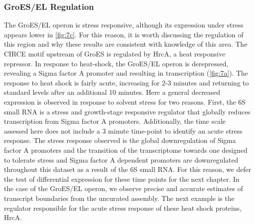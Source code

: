 \subsubsection{GroES/EL Regulation}
The GroES/EL operon is stress responsive, although its expression under stress appears lower in \ref{fig:7c}. For this reason, it is worth discussing the regulation of this region and why these results are consistent with knowledge of this area. The CIRCE motif upstream of GroES is regulated by HrcA, a heat responsive repressor\cite{42,77,78}. In response to heat-shock, the GroES/EL operon is derepressed, revealing a Sigma factor A promoter and resulting in transcription (\ref{fig:7a}). The response to heat shock is fairly acute, increasing for 2-3 minutes and returning to standard levels after an additional 10 minutes\cite{77}. Here a general decreased expression is observed in response to solvent stress for two reasons. First, the 6S small RNA is a stress and growth-stage responsive regulator that globally reduces transcription from Sigma factor A promoters\cite{39,79}. Additionally, the time scale assessed here does not include a 3 minute time-point to identify an acute stress response. The stress response observed is the global downregulation of Sigma factor A promoters and the transition of the transcriptome towards one designed to tolerate stress and Sigma factor A dependent promoters are downregulated throughout this dataset as a result of the 6S small RNA. For this reason, we defer the test of differential expression for these time points for the next chapter. In the case of the GroES/EL operon, we observe precise and accurate estimates of transcript boundaries from the uncurated assembly. The next example is the regulator responsible for the acute stress response of these heat shock proteins, HrcA.



